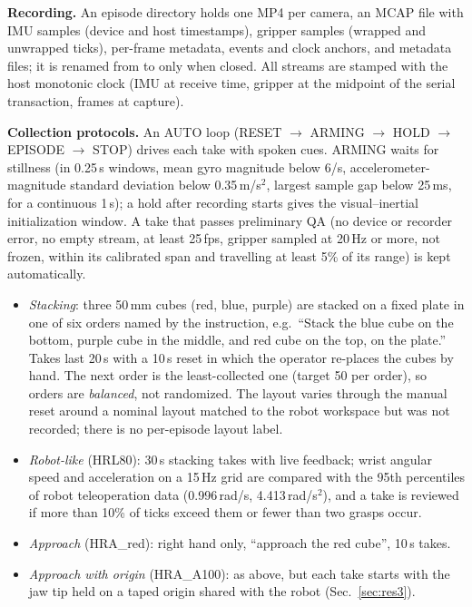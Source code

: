 \documentclass[conference,10pt]{IEEEtran}
\newcommand{\mm}{\,mm\xspace}
\begin{document}
\textbf{Recording.} An episode directory holds one MP4 per camera, an MCAP file with IMU samples (device and host timestamps),
gripper samples (wrapped and unwrapped ticks), per-frame metadata, events and clock anchors, and metadata files; it is renamed
from  to  only when closed. All streams are stamped with the host monotonic clock (IMU at
receive time, gripper at the midpoint of the serial transaction, frames at capture).

\textbf{Collection protocols.} An AUTO loop (RESET $\to$ ARMING $\to$ HOLD $\to$ EPISODE $\to$ STOP) drives each take with
spoken cues. ARMING waits for stillness (in 0.25\,s windows, mean gyro magnitude below 6\textdegree/s, accelerometer-magnitude
standard deviation below 0.35\,m/s$^2$, largest sample gap below 25\,ms, for a continuous 1\,s); a hold after recording starts
gives the visual--inertial initialization window. A take that passes preliminary QA (no device or recorder error, no empty
stream, at least 25\,fps, gripper sampled at 20\,Hz or more, not frozen, within its calibrated span and travelling at least 5\%
of its range) is kept automatically.
\begin{itemize}
\item \emph{Stacking}: three 50\mm cubes (red, blue, purple) are stacked on a fixed plate in one of six orders named by the
instruction, e.g.\ ``Stack the blue cube on the bottom, purple cube in the middle, and red cube on the top, on the plate.''
Takes last 20\,s with a 10\,s reset in which the operator re-places the cubes by hand. The next order is the least-collected
one (target 50 per order), so orders are \emph{balanced}, not randomized. The layout varies through the manual reset around a
nominal layout matched to the robot workspace but was not recorded; there is no per-episode layout label.
\item \emph{Robot-like} (HRL80): 30\,s stacking takes with live feedback; wrist angular speed and acceleration on a 15\,Hz grid
are compared with the 95th percentiles of robot teleoperation data (0.996\,rad/s, 4.413\,rad/s$^2$), and a take is reviewed if
more than 10\% of ticks exceed them or fewer than two grasps occur.
\item \emph{Approach} (HRA\_red): right hand only, ``approach the red cube'', 10\,s takes.
\item \emph{Approach with origin} (HRA\_A100): as above, but each take starts with the jaw tip held on a taped origin shared with
the robot (Sec.~\ref{sec:res3}).
\end{itemize}
\end{document}
